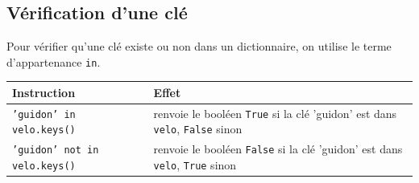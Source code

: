 \subsection*{Vérification d'une clé}
Pour vérifier qu'une clé existe ou non dans un dictionnaire, on utilise le terme d'appartenance \lstinline{in}.
\begin{center}
\begin{tabular}{lp{7cm}}
\hline \textbf{Instruction} & \textbf{Effet} \\
\hline
\texttt{'guidon' in velo.keys()} & renvoie le booléen \texttt{True} si la clé 'guidon' est dans \texttt{velo}, \texttt{False} sinon\\

\texttt{'guidon' not in velo.keys()} & renvoie le booléen \texttt{False} si la clé 'guidon' est dans \texttt{velo}, \texttt{True} sinon\\
\hline
\end{tabular}
\end{center}
